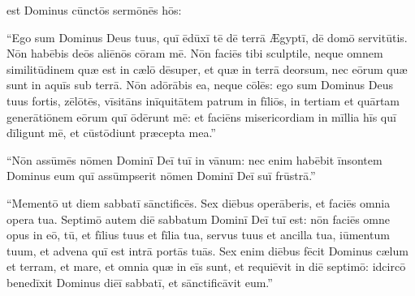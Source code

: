

\thispagestyle{empty}

 est Dominus cūnctōs sermōnēs hōs: 

``Ego sum Dominus Deus
tuus, quī ēdūxī tē dē terrā Ægyptī, dē domō servitūtis.  Nōn habēbis deōs
aliēnōs cōram mē. Nōn faciēs tibi sculptile, neque omnem
similitūdinem quæ est in cælō dēsuper, et
quæ in terrā deorsum, nec eōrum quæ sunt in aquīs sub terrā. 
Nōn adōrābis
ea, neque cōlēs: ego sum Dominus Deus tuus fortis,
zēlōtēs, vīsitāns
inīquitātem patrum in fīliōs, in tertiam et quārtam
generātiōnem eōrum quī ōdērunt mē:
et faciēns misericordiam in mīllia hīs quī dīligunt mē, et cūstōdiunt
præcepta mea.''

``Nōn assūmēs nōmen
Dominī Deī tuī in vānum: nec enim habēbit
īnsontem Dominus eum quī assūmpserit nōmen Dominī Deī suī
frūstrā.'' 

``Mementō ut diem sabbatī
sānctificēs. 
Sex diēbus operāberis, et
faciēs omnia opera tua. 
Septimō autem diē sabbatum Dominī Deī tuī est:
nōn faciēs omne opus in eō, tū, et fīlius tuus et fīlia tua, servus tuus et
ancilla tua, iūmentum tuum, et advena quī est intrā portās
tuās. 
Sex enim diēbus fēcit Dominus cælum et terram, et mare, et omnia
quæ in eīs sunt, et requiēvit in diē septimō: idcircō benedīxit Dominus diēī
sabbatī, et sānctificāvit eum.''


